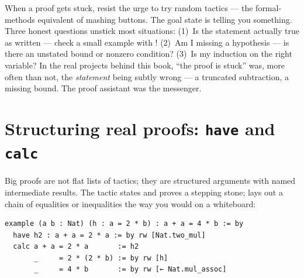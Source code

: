 \begin{pitfall}
When a proof gets stuck, resist the urge to try random tactics --- the
formal-methods equivalent of mashing buttons. The goal state is telling you
something. Three honest questions unstick most situations: (1)~Is the
statement actually true as written --- check a small example with
! (2)~Am I missing a hypothesis --- is there an unstated bound or
nonzero condition? (3)~Is my induction on the right variable? In the real
projects behind this book, ``the proof is stuck'' was, more often than not,
the \emph{statement} being subtly wrong --- a truncated subtraction, a missing
bound. The proof assistant was the messenger.
\end{pitfall}

\section{Structuring real proofs: \texttt{have} and \texttt{calc}}

Big proofs are not flat lists of tactics; they are structured arguments with
named intermediate results. The  tactic states and proves a
stepping stone;  lays out a chain of equalities or inequalities
the way you would on a whiteboard:

\begin{lstlisting}[language=Lean]
example (a b : Nat) (h : a = 2 * b) : a + a = 4 * b := by
  have h2 : a + a = 2 * a := by rw [Nat.two_mul]
  calc a + a = 2 * a       := h2
       _     = 2 * (2 * b) := by rw [h]
       _     = 4 * b       := by rw [← Nat.mul_assoc]
\end{lstlisting}

